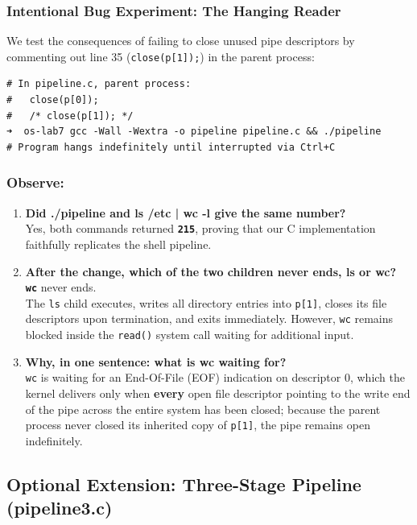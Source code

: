\documentclass{labreport}
\begin{document}
\subsubsection{Intentional Bug Experiment: The Hanging Reader}
We test the consequences of failing to close unused pipe descriptors by commenting out line 35 (\texttt{close(p[1]);}) in the parent process:

\begin{lstlisting}[style=bash]
# In pipeline.c, parent process:
#   close(p[0]);
#   /* close(p[1]); */
➜  os-lab7 gcc -Wall -Wextra -o pipeline pipeline.c && ./pipeline
# Program hangs indefinitely until interrupted via Ctrl+C
\end{lstlisting}

\subsubsection*{Observe:}
\begin{enumerate}[leftmargin=*]
    \item \textbf{Did ./pipeline and ls /etc | wc -l give the same number?}\\[0.2em]
    Yes, both commands returned \textbf{\texttt{215}}, proving that our C implementation faithfully replicates the shell pipeline.

    \item \textbf{After the change, which of the two children never ends, ls or wc?}\\[0.2em]
    \textbf{\texttt{wc}} never ends.\\
    The \texttt{ls} child executes, writes all directory entries into \texttt{p[1]}, closes its file descriptors upon termination, and exits immediately. However, \texttt{wc} remains blocked inside the \texttt{read()} system call waiting for additional input.

    \item \textbf{Why, in one sentence: what is wc waiting for?}\\[0.2em]
    \texttt{wc} is waiting for an End-Of-File (EOF) indication on descriptor 0, which the kernel delivers only when \textbf{every} open file descriptor pointing to the write end of the pipe across the entire system has been closed; because the parent process never closed its inherited copy of \texttt{p[1]}, the pipe remains open indefinitely.
\end{enumerate}

\subsection{Optional Extension: Three-Stage Pipeline (pipeline3.c)}
\end{document}

